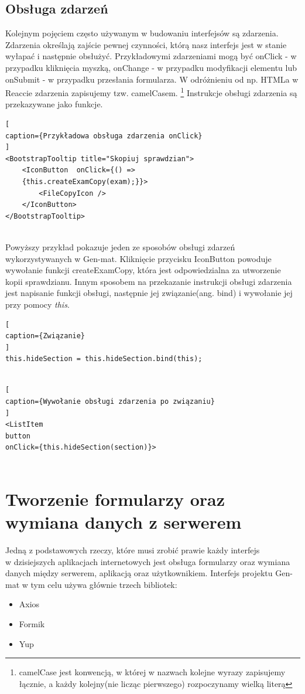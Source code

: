 \documentclass[oneside,polski,logo,indent]{amuthesis}
\begin{document}
\subsection{Obsługa zdarzeń}
{
Kolejnym pojęciem często używanym w budowaniu interfejsów są zdarzenia. Zdarzenia określają zajście pewnej czynności, którą nasz interfejs jest w stanie wyłapać i następnie obsłużyć.
Przykładowymi zdarzeniami mogą być onClick - w przypadku kliknięcia myszką, onChange - w przypadku modyfikacji elementu lub onSubmit - w przypadku przesłania formularza.
W odróżnieniu od np. HTMLa w Reaccie zdarzenia zapisujemy tzw. camelCasem. \footnote{camelCase jest konwencją, w której w nazwach kolejne wyrazy zapisujemy łącznie, a każdy kolejny(nie licząc pierwszego) rozpoczynamy wielką literą}
Instrukcje obsługi zdarzenia są przekazywane jako funkcje.

\begin{lstlisting}[
caption={Przykładowa obsługa zdarzenia onClick}
]
<BootstrapTooltip title="Skopiuj sprawdzian">
	<IconButton  onClick={() => 
	{this.createExamCopy(exam);}}>
		<FileCopyIcon />
	</IconButton>
</BootstrapTooltip>


\end{lstlisting}

}
Powyższy przykład pokazuje jeden ze sposobów obsługi zdarzeń wykorzystywanych w Gen-mat. Kliknięcie przycisku IconButton powoduje wywołanie funkcji createExamCopy, która jest odpowiedzialna za utworzenie kopii sprawdzianu.
Innym sposobem na przekazanie instrukcji obsługi zdarzenia jest napisanie funkcji obsługi, następnie jej związanie(ang. bind) i wywołanie jej przy pomocy {\it this}.

\begin{lstlisting}[
caption={Związanie}
]
this.hideSection = this.hideSection.bind(this);


\end{lstlisting}

\begin{lstlisting}[
caption={Wywołanie obsługi zdarzenia po związaniu}
]
<ListItem
button 
onClick={this.hideSection(section)}>


\end{lstlisting}



\section{Tworzenie formularzy oraz wymiana danych z serwerem}
\bigbreak
Jedną z podstawowych rzeczy, które musi zrobić prawie każdy interfejs \\w dzisiejszych aplikacjach internetowych jest obsługa formularzy oraz wymiana danych między serwerem, aplikacją oraz użytkownikiem. Interfejs projektu Gen-mat w tym celu używa głównie trzech bibliotek:
\begin{itemize}
\item Axios
\item Formik
\item Yup
\end{itemize}
\end{document}
